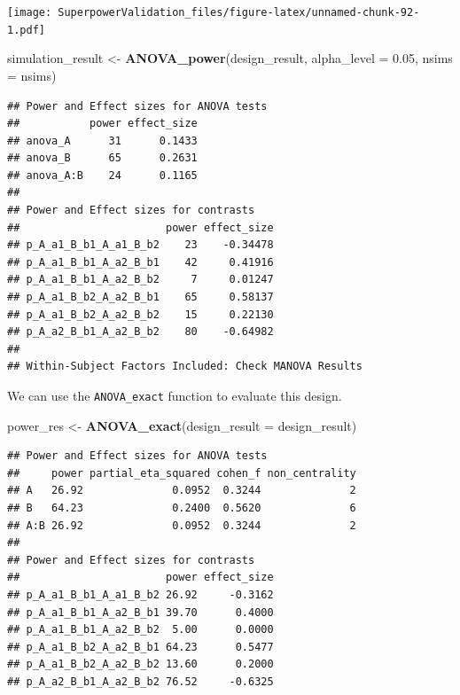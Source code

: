 \documentclass[]{book}
\newenvironment{Shaded}{\begin{snugshade}}{\end{snugshade}}
\newcommand{\DataTypeTok}[1]{\textcolor[rgb]{0.13,0.29,0.53}{#1}}
\newcommand{\FloatTok}[1]{\textcolor[rgb]{0.00,0.00,0.81}{#1}}
\newcommand{\KeywordTok}[1]{\textcolor[rgb]{0.13,0.29,0.53}{\textbf{#1}}}
\newcommand{\NormalTok}[1]{#1}
\newcommand{\OperatorTok}[1]{\textcolor[rgb]{0.81,0.36,0.00}{\textbf{#1}}}
\newcommand{\StringTok}[1]{\textcolor[rgb]{0.31,0.60,0.02}{#1}}
\begin{document}
\texttt{[image: SuperpowerValidation\_files/figure-latex/unnamed-chunk-92-1.pdf]}

\begin{Shaded}
\begin{Highlighting}[]
\NormalTok{simulation_result <-}\StringTok{ }\KeywordTok{ANOVA_power}\NormalTok{(design_result, }\DataTypeTok{alpha_level =} \FloatTok{0.05}\NormalTok{, }\DataTypeTok{nsims =}\NormalTok{ nsims)}
\end{Highlighting}
\end{Shaded}

\begin{verbatim}
## Power and Effect sizes for ANOVA tests
##           power effect_size
## anova_A      31      0.1433
## anova_B      65      0.2631
## anova_A:B    24      0.1165
## 
## Power and Effect sizes for contrasts
##                       power effect_size
## p_A_a1_B_b1_A_a1_B_b2    23    -0.34478
## p_A_a1_B_b1_A_a2_B_b1    42     0.41916
## p_A_a1_B_b1_A_a2_B_b2     7     0.01247
## p_A_a1_B_b2_A_a2_B_b1    65     0.58137
## p_A_a1_B_b2_A_a2_B_b2    15     0.22130
## p_A_a2_B_b1_A_a2_B_b2    80    -0.64982
## 
## Within-Subject Factors Included: Check MANOVA Results
\end{verbatim}

We can use the \texttt{ANOVA\_exact} function to evaluate this design.

\begin{Shaded}
\begin{Highlighting}[]
\NormalTok{power_res <-}\StringTok{ }\KeywordTok{ANOVA_exact}\NormalTok{(}\DataTypeTok{design_result =}\NormalTok{ design_result)}
\end{Highlighting}
\end{Shaded}

\begin{verbatim}
## Power and Effect sizes for ANOVA tests
##     power partial_eta_squared cohen_f non_centrality
## A   26.92              0.0952  0.3244              2
## B   64.23              0.2400  0.5620              6
## A:B 26.92              0.0952  0.3244              2
## 
## Power and Effect sizes for contrasts
##                       power effect_size
## p_A_a1_B_b1_A_a1_B_b2 26.92     -0.3162
## p_A_a1_B_b1_A_a2_B_b1 39.70      0.4000
## p_A_a1_B_b1_A_a2_B_b2  5.00      0.0000
## p_A_a1_B_b2_A_a2_B_b1 64.23      0.5477
## p_A_a1_B_b2_A_a2_B_b2 13.60      0.2000
## p_A_a2_B_b1_A_a2_B_b2 76.52     -0.6325
\end{verbatim}

\begin{Shaded}
\end{Shaded}
\end{document}
